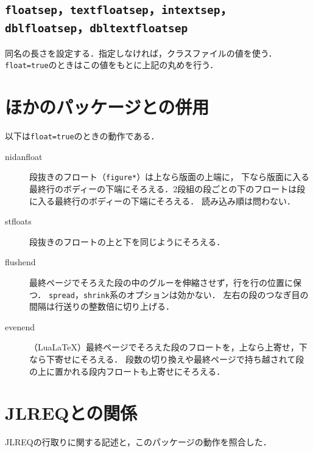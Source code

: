 \documentclass[paper=a4,dvipdfmx]{jlreq}
\newcommand\pkg[1]{\textsf{#1}}
\newcommand\opt[1]{\texttt{#1}}
\newcommand\env[1]{\texttt{#1}}
\begin{document}
\subsection{\opt{floatsep}，\opt{textfloatsep}，\opt{intextsep}，
  \opt{dblfloatsep}，\opt{dbltextfloatsep}}

同名の長さを設定する．指定しなければ，クラスファイルの値を使う．
\opt{float=true}のときはこの値をもとに上記の丸めを行う．

\section{ほかのパッケージとの併用}

以下は\opt{float=true}のときの動作である．
\begin{description}
\item[\pkg{nidanfloat}] 段抜きのフロート（\env{figure*}）は上なら版面の上端に，
 下なら版面に入る最終行のボディーの下端にそろえる．2段組の段ごとの下のフロートは段に入る最終行のボディーの下端にそろえる．
 読み込み順は問わない．
\item[\pkg{stfloats}] 段抜きのフロートの上と下を同じようにそろえる．
\item[\pkg{flushend}] 最終ページでそろえた段の中のグルーを伸縮させず，行を行の位置に保つ．
 \opt{spread}，\opt{shrink}系のオプションは効かない．
 左右の段のつなぎ目の間隔は行送りの整数倍に切り上げる．
\item[\pkg{evenend}] （LuaLaTeX）最終ページでそろえた段のフロートを，上なら上寄せ，下なら下寄せにそろえる．
 段数の切り換えや最終ページで持ち越されて段の上に置かれる段内フロートも上寄せにそろえる．
\end{description}

\section{JLREQとの関係}

JLREQの行取りに関する記述と，このパッケージの動作を照合した．
\end{document}
